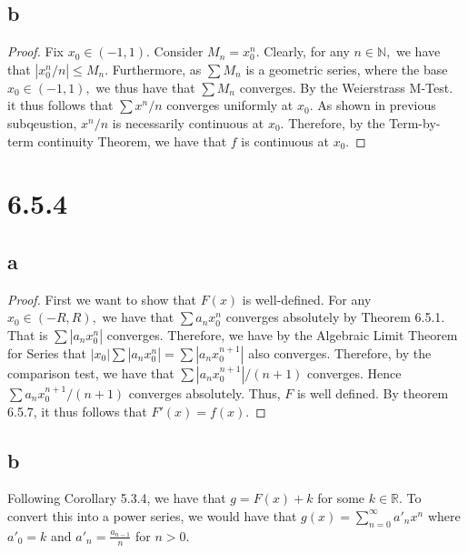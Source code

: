 \documentclass[10pt]{article}
\begin{document}
\subsection*{b}

\begin{proof}
    Fix $x_0 \in (-1,1).$ Consider $M_n = x_0^n.$ Clearly, for any $n\in\mathbb{N},$ we have that $|x_0^n/n|\le M_n.$ Furthermore, as $\sum M_n$ is a geometric series, where the base $x_0\in(-1,1),$ we thus have that $\sum M_n$ converges. By the  Weierstrass M-Test. it thus follows that $\sum x^n/n$ converges uniformly at $x_0.$ As shown in previous subqeustion, $x^n/n$ is necessarily continuous at $x_0.$ Therefore, by the Term-by-term continuity Theorem, we have that $f$ is continuous at $x_0$.
\end{proof}

\section*{6.5.4}
\subsection*{a}

\begin{proof}
    First we want to show that $F(x)$ is well-defined. For any $x_0\in (-R, R),$ we have that $\sum a_n x_0^n$ converges absolutely by Theorem 6.5.1. That is $\sum |a_n x_0^n|$ converges. Therefore, we have by the Algebraic Limit Theorem for Series that $|x_0|\sum |a_n x_0^n| = \sum |a_n x_0^{n+1}|$ also converges. Therefore, by the comparison test, we have that $\sum |a_n x_0^{n+1}|/(n+1)$ converges. Hence $\sum a_n x_0^{n+1}/(n+1)$ converges absolutely. Thus, $F$ is well defined. By theorem 6.5.7, it thus follows that $F'(x)=f(x).$
\end{proof}

\subsection*{b}
Following Corollary 5.3.4, we have that $g = F(x)+k$ for some $k\in\mathbb{R}.$ To convert this into a power series, we would have
that $g(x)=\sum_{n=0}^{\infty}a'_n x^n$ where $a'_0 = k$ and $a'_n=\frac{a_{n-1}}{n}$ for $n>0.$

\end{document}
